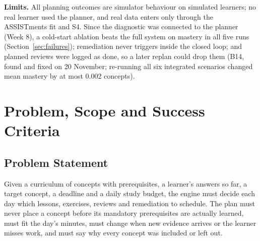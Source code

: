 \documentclass[english]{sintr}
\begin{document}
\vspace{0.2em}\newline
\textbf{Limits.} All planning outcomes are simulator behaviour on simulated learners; no real learner used the planner, and real data enters only through the ASSISTments fit and S4. Since the diagnostic was connected to the planner (Week 8), a cold-start ablation beats the full system on mastery in all five runs (Section~\ref{sec:failures}); remediation never triggers inside the closed loop; and planned reviews were logged as done, so a later replan could drop them (B14, found and fixed on 20 November; re-running all six integrated scenarios changed mean mastery by at most 0.002 concepts).
\newpage
\tableofcontents
\newpage

\section{Problem, Scope and Success Criteria}
\subsection{Problem Statement}
Given a curriculum of concepts with prerequisites, a learner's answers so far, a target concept, a deadline and a daily study budget, the engine must decide each day which lessons, exercises, reviews and remediation to schedule. The plan must never place a concept before its mandatory prerequisites are actually learned, must fit the day's minutes, must change when new evidence arrives or the learner misses work, and must say why every concept was included or left out. 
\end{document}

